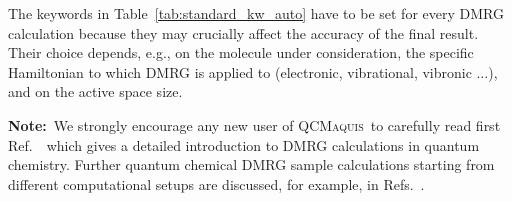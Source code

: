 \documentclass[bibliography=totoc,12pt,a4paper]{scrartcl}
\newcommand{\qcm}{\textsc{QCMaquis}}
\begin{document}
The keywords in Table~\ref{tab:standard_kw_auto} have to be set for every DMRG calculation because they may crucially affect the accuracy of the final result.
Their choice depends, e.g., on the molecule under consideration, the specific Hamiltonian to which DMRG is applied to (electronic, vibrational, vibronic $\ldots$), and on the active space size.

\begin{framed}
  \noindent\textbf{Note:}\ We strongly encourage any new user of \qcm\ to carefully read first Ref.\ \ which gives a detailed introduction to
  DMRG calculations in quantum chemistry.
  Further quantum chemical DMRG sample calculations starting from different computational setups are discussed, for example, in Refs.~\cite{interface,ru-dmrg,fde-dmrg,srdft-dmrg}.
\end{framed}
\end{document}
